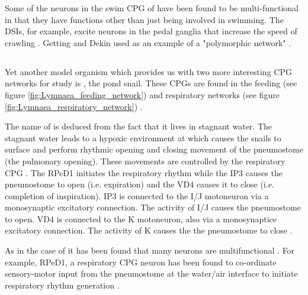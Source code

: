 Some of the neurons in the swim \ac{CPG} of  have been found to be multi-functional in that they have functions other than just being involved in swimming. The \acp{DSI}, for example, excite neurons in the pedal ganglia that increase the speed of crawling \cite{Popescu2002}. Getting and Dekin used  as an example of a "polymorphic network" \cite{Getting1985a}.

\subsection{}
Yet another model organism which provides us with two more interesting \ac{CPG} networks for study is , the pond snail. These \acp{CPG} are found in the feeding (see figure \ref{fig:Lymnaea_feeding_network}) and respiratory networks (see figure \ref{fig:Lymnaea_respiratory_network})  \cite{Kemenes2009}.

The name of  is deduced from the fact that it lives in stagnant water. The stagnant water leads to a hypoxic environment at which causes the snails to surface and perform rhythmic opening and closing movement of the pneumostome (the pulmonary opening). These movements are controlled by the respiratory \ac{CPG} \cite{Benjamin2008}. The \ac{RPeD1} initiates the respiratory rhythm while the \ac{IP3} causes the pneumostome to open (i.e. expiration) and the \ac{VD4} causes it to close (i.e. completion of inspiration). \ac{IP3} is connected to the I/J motoneuron via a monosynaptic excitatory connection. The activity of I/J causes the pneumostome to open. \ac{VD4} is connected to the K motoneuron, also via a monosynaptice excitatory connection. The activity of K causes the the pneumostome to close  \cite{Taylor2000}.

As in the case of  it has been found that many  neurons are multifunctional \cite{Syed1991a, Kemenes2009}. For example, \ac{RPeD1}, a respiratory \ac{CPG} neuron has been found to co-ordinate sensory-motor input from the pneumostome at the water/air interface to initiate respiratory rhythm generation \cite{Haque2006}.

